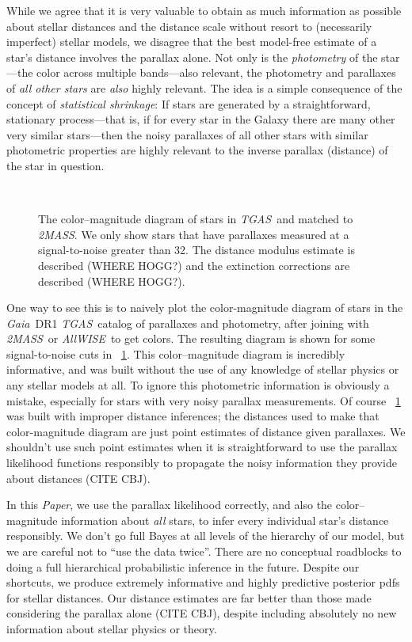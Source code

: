 \documentclass[12pt]{article}
\newcommand{\documentname}{\textsl{Paper}}
\newcommand{\project}[1]{\textsl{#1}}
\newcommand{\acronym}[1]{\small{#1}}
\newcommand{\gaia}{\project{Gaia}}
\newcommand{\tgas}{\project{\acronym{TGAS}}}
\newcommand{\twomass}{\project{\acronym{2MASS}}}
\newcommand{\wise}{\project{All\acronym{WISE}}}
\begin{document}
While we agree that it is very valuable to obtain as much information
as possible about stellar distances and the distance scale without
resort to (necessarily imperfect) stellar models, we disagree that the
best model-free estimate of a star's distance involves the parallax
alone.
Not only is the \emph{photometry} of the star---the color across
multiple bands---also relevant, the photometry and parallaxes of
\emph{all other stars} are \emph{also} highly relevant.
The idea is a simple consequence of the concept of \emph{statistical shrinkage}:
If stars are generated by a straightforward, stationary process---that
is, if for every star in the Galaxy there are many other very similar
stars---then the noisy parallaxes of all other stars with similar
photometric properties are highly relevant to the inverse parallax
(distance) of the star in question.

\begin{figure}[p]
~~
\caption{The color--magnitude diagram of stars in \tgas\ and matched
  to \twomass. We only show stars that have parallaxes measured at a
  signal-to-noise greater than 32. The distance modulus estimate is
  described (WHERE HOGG?) and the extinction corrections are described
  (WHERE HOGG?).\label{fig:cmd}}
\end{figure}

One way to see this is to naively plot the color-magnitude diagram of
stars in the \gaia\ \acronym{DR1} \tgas\ catalog of parallaxes and
photometry, after joining with \twomass\ or \wise\ to get colors.
The resulting diagram is shown for some signal-to-noise cuts in
\figurename~\ref{fig:cmd}.
This color--magnitude diagram is incredibly informative, and was built
without the use of any knowledge of stellar physics or any stellar models at all.
To ignore this photometric information is obviously a mistake, especially for
stars with very noisy parallax measurements.
Of course \figurename~\ref{fig:cmd} was built with improper distance
inferences; the distances used to make that color-magnitude diagram
are just point estimates of distance given parallaxes.
We shouldn't use such point estimates when it is straightforward to
use the parallax likelihood functions responsibly to propagate the noisy
information they provide about distances (CITE CBJ).

In this \documentname, we use the parallax likelihood correctly, and also the
color--magnitude information about \emph{all} stars, to infer every
individual star's distance responsibly.
We don't go full Bayes at all levels of the hierarchy of our model,
but we are careful not to ``use the data twice''.
There are no conceptual roadblocks to doing a full hierarchical
probabilistic inference in the future.
Despite our shortcuts, we produce extremely informative and highly
predictive posterior pdfs for stellar distances.
Our distance estimates are far better than those made considering the
parallax alone (CITE CBJ), despite including absolutely no new
information about stellar physics or theory.
\end{document}
